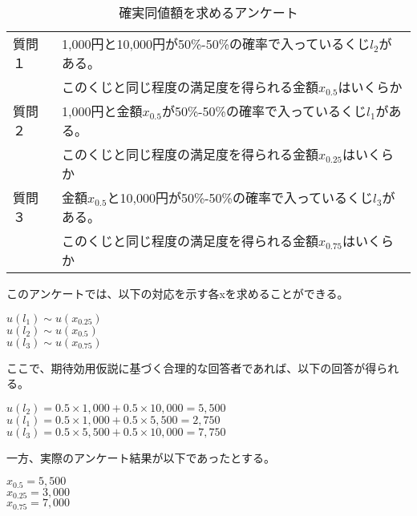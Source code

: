 \documentclass[a4j,12pt]{jsarticle}
\begin{document}
\begin{table}[h]
\begin{center}
\begin{tabular}{ll} 																	\toprule
	質問１		 	& 1,000円と10,000円が50\%-50\%の確率で入っているくじ$l_{2}$がある。	\\
                                & このくじと同じ程度の満足度を得られる金額$x_{0.5}$はいくらか			\\ \midrule
	質問２		 	& 1,000円と金額$x_{0.5}$が50\%-50\%の確率で入っているくじ$l_{1}$がある。 	\\
					& このくじと同じ程度の満足度を得られる金額$x_{0.25}$はいくらか			\\ \midrule
	質問３		 	& 金額$x_{0.5}$と10,000円が50\%-50\%の確率で入っているくじ$l_{3}$がある。	\\
					& このくじと同じ程度の満足度を得られる金額$x_{0.75}$はいくらか			\\ 	\bottomrule


\end{tabular}
\end{center}
\caption{確実同値額を求めるアンケート}
\end{table}

このアンケートでは、以下の対応を示す各xを求めることができる。
\begin{center}

$u(l_1)\sim u(x_{0.25})$ \\
$u(l_2)\sim u(x_{0.5})$ \\
$u(l_3)\sim u(x_{0.75})$

\end{center}

ここで、期待効用仮説に基づく合理的な回答者であれば、以下の回答が得られる。


\begin{center}

$u(l_2)=0.5\times 1,000 + 0.5 \times 10,000 = 5,500$ \\
$u(l_1)=0.5\times 1,000 + 0.5 \times 5,500 = 2,750$ \\
$u(l_3)=0.5\times 5,500 + 0.5 \times 10,000 = 7,750$

\end{center}

一方、実際のアンケート結果が以下であったとする。

\begin{center}

$x_{0.5}=5,500$ \\
$x_{0.25}=3,000$ \\
$x_{0.75}=7,000$ \\

\end{center}
\end{document}
